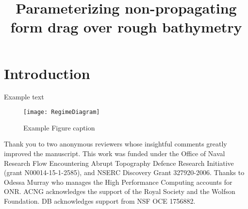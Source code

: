 \documentclass{ametsocV5}
\title{Parameterizing non-propagating form drag over rough bathymetry}
\affiliation{University of Victoria, Victoria, BC, Canada}
\begin{document}
\maketitle

\section{Introduction}
Example text

\begin{figure}[hbt]
  \begin{center}
    \texttt{[image: RegimeDiagram]}
    \caption{Example Figure caption}
    \label{fig:RegimeDiagram}
  \end{center}
\end{figure}



\acknowledgments

Thank you to two anonymous reviewers whose insightful comments greatly improved the manuscript. This work was funded under the Office of Naval Research Flow Encountering Abrupt Topography Defence Research Initiative (grant N00014-15-1-2585), and NSERC Discovery Grant 327920-2006.  Thanks to Odessa Murray who manages the High Performance Computing accounts for ONR. ACNG acknowledges the support of the Royal Society and the Wolfson Foundation.  DB acknowledges support from NSF OCE 1756882.







%
\end{document}
